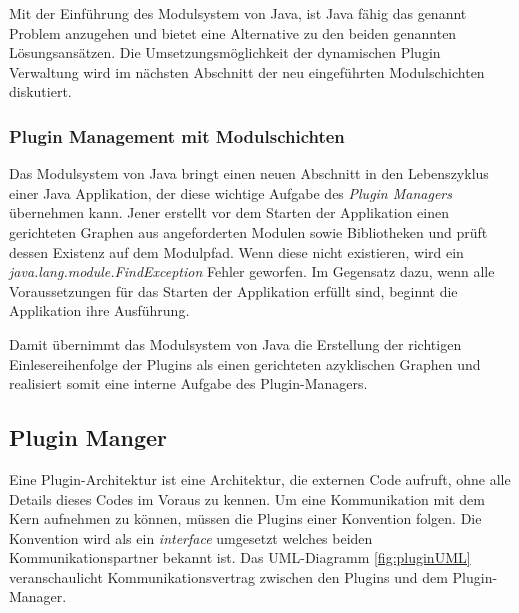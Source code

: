 			Mit der Einführung des Modulsystem von Java, ist Java fähig das genannt Problem anzugehen und bietet eine Alternative zu den beiden genannten Lösungsansätzen. Die Umsetzungsmöglichkeit der dynamischen Plugin Verwaltung wird im nächsten Abschnitt der neu eingeführten Modulschichten diskutiert. 

			\subsubsection{Plugin Management mit Modulschichten}\label{ssub:plugin_managment_mit_modulschichten}
			


\newpage
		Das Modulsystem von Java bringt einen neuen Abschnitt in den Lebenszyklus einer Java Applikation, der diese wichtige Aufgabe des \textit{Plugin Managers} übernehmen kann. Jener erstellt vor dem Starten der Applikation einen gerichteten Graphen aus angeforderten Modulen sowie Bibliotheken und prüft dessen Existenz auf dem Modulpfad. Wenn diese nicht existieren, wird ein \textit{java.lang.module.FindException} Fehler geworfen. Im Gegensatz dazu, wenn alle Voraussetzungen für das Starten der Applikation erfüllt sind, beginnt die Applikation ihre Ausführung. \bigbreak

		Damit übernimmt das Modulsystem von Java die Erstellung der richtigen Einlesereihenfolge der Plugins als einen gerichteten azyklischen Graphen und realisiert somit eine interne Aufgabe des Plugin-Managers.


	\subsection{Plugin Manger }\label{sub:module_layer}
		Eine Plugin-Architektur ist eine Architektur, die externen Code aufruft, ohne alle Details dieses Codes im Voraus zu kennen. Um eine Kommunikation mit dem Kern aufnehmen zu können, müssen die Plugins einer Konvention folgen. Die Konvention wird als ein \textit{interface} umgesetzt welches beiden Kommunikationspartner bekannt ist. Das UML-Diagramm \ref{fig:pluginUML} veranschaulicht Kommunikationsvertrag zwischen den Plugins und dem Plugin-Manager. \newline


